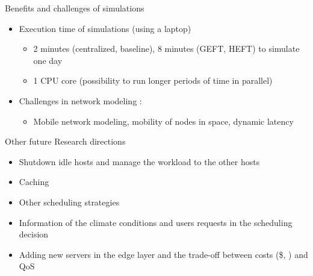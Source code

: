 \documentclass[Ligatures=TeX,table,svgnames,usetotalslideindicator,compress,10pt,aspectratio=169]{beamer}
\begin{document}
\begin{frame}{Benefits and challenges of simulations}

\begin{itemize}
    \item Execution time of simulations (using a laptop) 
    \begin{itemize}
        \item  2 minutes (centralized, baseline), 8 minutes (GEFT, HEFT) to simulate one day
        \item 1 CPU core (possibility to run longer periods of time in parallel)
    \end{itemize}
    \item Challenges in network modeling :
    \begin{itemize}
        \item  Mobile network modeling, mobility of nodes in space, dynamic latency
    \end{itemize}
    
\end{itemize}

\end{frame}

\begin{frame}{Other future Research directions}

\begin{itemize}
    \item Shutdown idle hosts and manage the workload to the other hosts
    \item Caching
    \item Other scheduling strategies
    \item Information of the climate conditions and users requests in the scheduling decision
    \item Adding new servers in the edge layer and the trade-off between costs (\$, ) and QoS
\end{itemize}
\end{frame}

\appendix
\end{document}
